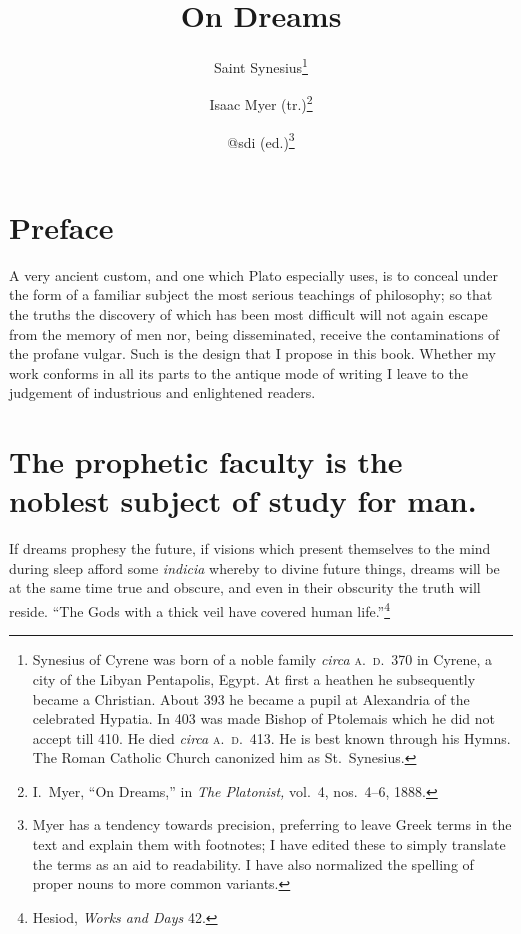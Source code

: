 \documentclass[12pt]{article}
\title{On Dreams}
\author{Saint Synesius\footnote{Synesius of Cyrene was born of a noble family
\textit{circa} \textsc{a.~d.}~370 in Cyrene, a city of the Libyan Pentapolis,
Egypt. At first a heathen he subsequently became a Christian. About 393 he
became a pupil at Alexandria of the celebrated Hypatia. In 403 was made Bishop
of Ptolemais which he did not accept till 410. He died \textit{circa}
\textsc{a.~d.}~413. He is best known through his Hymns. The Roman Catholic
Church canonized him as St.~Synesius.} \and Isaac Myer (tr.)\footnote{I.~Myer,
``On Dreams,'' in \textit{The Platonist,} vol.~4, nos.~4--6, 1888.} \and @sdi
(ed.)\footnote{Myer has a tendency towards precision, preferring to leave Greek
terms in the text and explain them with footnotes; I have edited these to
simply translate the terms as an aid to readability. I have also normalized
the spelling of proper nouns to more common variants.}}
\date{}
\begin{document}
\maketitle

\section*{Preface}

A very ancient custom, and one which Plato especially uses, is to conceal under
the form of a familiar subject the most serious teachings of philosophy; so
that the truths the discovery of which has been most difficult will not again
escape from the memory of men nor, being disseminated, receive the
contaminations of the profane vulgar. Such is the design that I propose in this
book. Whether my work conforms in all its parts to the antique mode of writing
I leave to the judgement of industrious and enlightened readers.


\section{The prophetic faculty is the noblest subject of study for man.}

If dreams prophesy the future, if visions which present themselves to the mind
during sleep afford some \textit{indicia} whereby to divine future things,
dreams will be at the same time true and obscure, and even in their obscurity
the truth will reside. ``The Gods with a thick veil have covered human
life.''\footnote{Hesiod, \textit{Works and Days} 42.}
\end{document}
